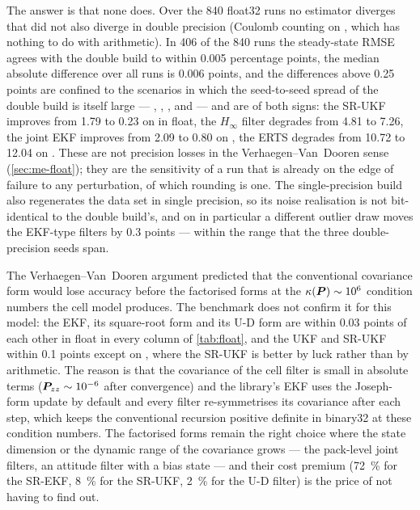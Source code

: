 The answer is that none does. Over the 840 float32 runs no estimator diverges that did not
also diverge in double precision (Coulomb counting on , which has nothing to
do with arithmetic). In 406 of the 840 runs the steady-state RMSE agrees with the double build
to within \num{0.005} percentage points, the median absolute difference over all runs is
\num{0.006} points, and the differences above \num{0.25} points are confined to the scenarios in
which the seed-to-seed spread of the double build is itself large --- ,
, ,  and  --- and are of both
signs: the SR-UKF improves from \num{1.79} to \num{0.23} on  in float, the
$H_\infty$ filter degrades from \num{4.81} to \num{7.26}, the joint EKF improves from \num{2.09}
to \num{0.80} on , the ERTS degrades from \num{10.72} to \num{12.04} on
. These are not precision losses in the Verhaegen--Van~Dooren sense
(\cref{sec:me-float}); they are the sensitivity of a run that is already on the edge of
failure to any perturbation, of which rounding is one. The single-precision build also
regenerates the data set in single precision, so its noise realisation is not bit-identical to
the double build's, and on  in particular a different outlier draw moves the
EKF-type filters by \num{0.3} points --- within the range that the three double-precision seeds
span.

The Verhaegen--Van~Dooren argument predicted that the conventional covariance form would lose
accuracy before the factorised forms at the $\kappa(\bm{P}) \sim 10^6$ condition numbers the cell
model produces. The benchmark does not confirm it for this model: the EKF, its square-root form
and its U-D form are within \num{0.03} points of each other in float in every column of
\cref{tab:float}, and the UKF and SR-UKF within \num{0.1} points except on ,
where the SR-UKF is better by luck rather than by arithmetic. The reason is that the covariance of the cell filter
is small in absolute terms ($\bm{P}_{zz} \sim 10^{-6}$ after convergence) and the library's
EKF uses the Joseph-form update by default and every filter re-symmetrises its covariance
after each step, which keeps the conventional recursion positive definite in binary32 at these
condition numbers. The factorised forms remain
the right choice where the state dimension or the dynamic range of the covariance grows --- the
pack-level joint filters, an attitude filter with a bias state --- and their cost premium
(\SI{72}{\percent} for the SR-EKF, \SI{8}{\percent} for the SR-UKF, \SI{2}{\percent} for the U-D
filter) is the price of not having to find out.

